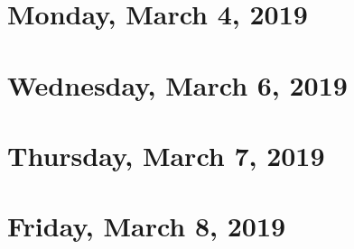 \documentclass[reqno]{amsart}
\begin{document}
\section{Monday, March 4, 2019}
    

\section{Wednesday, March 6, 2019}
    

\section{Thursday, March 7, 2019}
    

\section{Friday, March 8, 2019}
    
\end{document}
